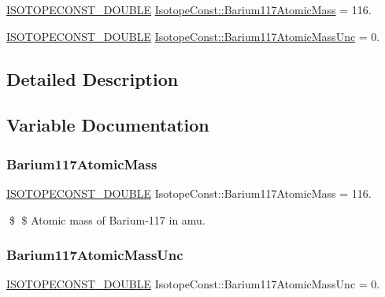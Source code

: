\begin{DoxyCompactItemize}
\item 
\mbox{\hyperlink{group___isotope_const-_macros_ga8f45a7272ce02c0b4c65c44636ed719a}{I\+S\+O\+T\+O\+P\+E\+C\+O\+N\+S\+T\+\_\+\+D\+O\+U\+B\+LE}} \mbox{\hyperlink{group___isotope_const-_barium-_ba117_ga429d778ecf8cad56e75b54094ae0c1f1}{Isotope\+Const\+::\+Barium117\+Atomic\+Mass}} = 116.
\item 
\mbox{\hyperlink{group___isotope_const-_macros_ga8f45a7272ce02c0b4c65c44636ed719a}{I\+S\+O\+T\+O\+P\+E\+C\+O\+N\+S\+T\+\_\+\+D\+O\+U\+B\+LE}} \mbox{\hyperlink{group___isotope_const-_barium-_ba117_ga869de6f1eacbbfbc36eb3bf77187edca}{Isotope\+Const\+::\+Barium117\+Atomic\+Mass\+Unc}} = 0.
\end{DoxyCompactItemize}


\subsection{Detailed Description}


\subsection{Variable Documentation}
\mbox{\label{group___isotope_const-_barium-_ba117_ga429d778ecf8cad56e75b54094ae0c1f1}} 
\subsubsection{\texorpdfstring{Barium117\+Atomic\+Mass}{Barium117AtomicMass}}
{\footnotesize\ttfamily \mbox{\hyperlink{group___isotope_const-_macros_ga8f45a7272ce02c0b4c65c44636ed719a}{I\+S\+O\+T\+O\+P\+E\+C\+O\+N\+S\+T\+\_\+\+D\+O\+U\+B\+LE}} Isotope\+Const\+::\+Barium117\+Atomic\+Mass = 116.}

\$ \$ Atomic mass of Barium-\/117 in amu. \mbox{\label{group___isotope_const-_barium-_ba117_ga869de6f1eacbbfbc36eb3bf77187edca}} 
\subsubsection{\texorpdfstring{Barium117\+Atomic\+Mass\+Unc}{Barium117AtomicMassUnc}}
{\footnotesize\ttfamily \mbox{\hyperlink{group___isotope_const-_macros_ga8f45a7272ce02c0b4c65c44636ed719a}{I\+S\+O\+T\+O\+P\+E\+C\+O\+N\+S\+T\+\_\+\+D\+O\+U\+B\+LE}} Isotope\+Const\+::\+Barium117\+Atomic\+Mass\+Unc = 0.}

